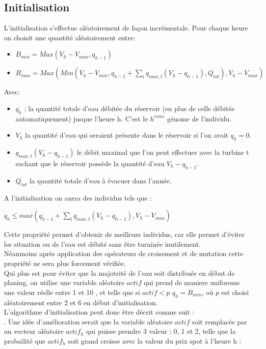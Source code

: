 \documentclass[a4paper]{report}
\begin{document}
\subsection*{Initialisation}
L'initialisation s'effectue aléatoirement de façon incrémentale.
Pour chaque heure on choisit une quantité aléatoirement entre:
\begin{itemize}
  \item  $B_{min}=Max(V_h-V_{max},q_{h-1})$
  \item $B_{max}= Max(Min(V_h-V_{min},q_{h-1}+\sum_t q_{max,t}(V_h-q_{h-1}),Q_{tot}),V_{h}-V_{max})$\\
\end{itemize}  
Avec:\\
\begin{itemize}
  \item $q_h$ : la quantité totale d'eau débitée du réservoir (en plus de celle débitée automatiquement) jusque l'heure h. C'est le $h^{ieme}$ génome de l'individu.
  \item $V_h$ la quantité d'eau qui seraient présente dans le réservoir si l'on avait $q_h=0$.
  \item $q_{max,t}(V_h-q_{h-1})$ le débit maximal que l'on peut effectuer avec la turbine t sachant que le réservoir possède la quantité d'eau $V_h - q_{h-1}$.
  \item $Q_{tot} $ la quantité totale d'eau à évacuer dans l'année.
\end{itemize}
A l'initialisation on aurra des individus tels que :
\begin{center}
  $q_h \leq max(q_{h-1}+\sum_t q_{max,t}(V_h-q_{h-1}),V_{h}-V_{max})$
\end{center}
Cette propriété permet d'obtenir de meilleurs individus, car elle permet d'éviter les situation ou de l'eau est débité sans être turninée inutilement.\\
Néanmoins après application des opérateurs de croisement et de mutation cette propriété ne sera plus forcement vérifiée.\\
Qui plus est pour éviter que la majotrité de l'eau soit distribuée en début de planing, on utilise une variable aléatoire $actif$ qui prend de maniere uniforeme une valeur réelle entre 1 et 10 , et telle que si $actif<p$ $q_h=B_{min}$, où $p$ est choisi aléatoirement entre 2 et 6 en début d'initialisation.\\
L'algorithme d'initialisation peut donc être décrit comme suit :\\
. 
 Une idée d'amélioration serait que la variable aléatoire $actif$ soit remplacée par un vecteur aléatoire $actif_h$ qui puisse prendre 3 valeur : 0, 1 et 2, telle que la probailité que $actif_h$ soit grand croisse avec la valeur du prix spot à l'heure h :
\end{document}
